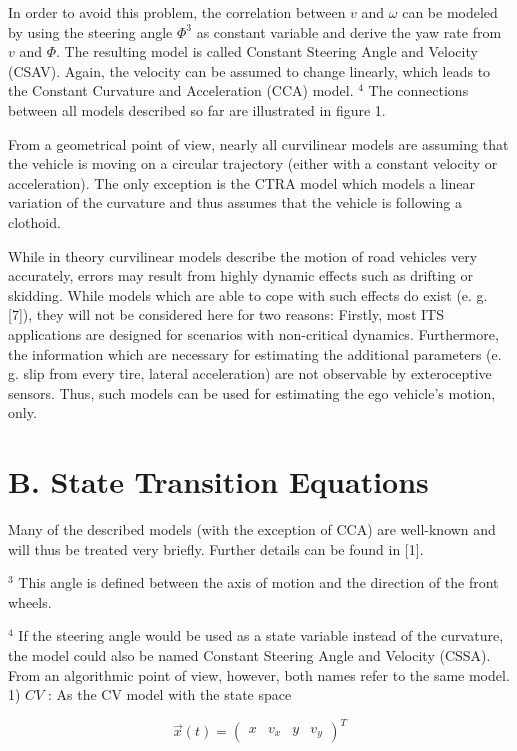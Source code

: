 In order to avoid this problem, the correlation between $v$ and $\omega$ can be modeled by using the steering angle $\Phi^{3}$ as constant variable and derive the yaw rate from $v$ and $\Phi$. The resulting model is called Constant Steering Angle and Velocity (CSAV). Again, the velocity can be assumed to change linearly, which leads to the Constant Curvature and Acceleration (CCA) model. ${ }^{4}$ The connections between all models described so far are illustrated in figure 1.

From a geometrical point of view, nearly all curvilinear models are assuming that the vehicle is moving on a circular trajectory (either with a constant velocity or acceleration). The only exception is the CTRA model which models a linear variation of the curvature and thus assumes that the vehicle is following a clothoid.

While in theory curvilinear models describe the motion of road vehicles very accurately, errors may result from highly dynamic effects such as drifting or skidding. While models which are able to cope with such effects do exist (e. g. [7]), they will not be considered here for two reasons: Firstly, most ITS applications are designed for scenarios with non-critical dynamics. Furthermore, the information which are necessary for estimating the additional parameters (e. g. slip from every tire, lateral acceleration) are not observable by exteroceptive sensors. Thus, such models can be used for estimating the ego vehicle's motion, only.

\section{B. State Transition Equations}
Many of the described models (with the exception of CCA) are well-known and will thus be treated very briefly. Further details can be found in [1].

${ }^{3}$ This angle is defined between the axis of motion and the direction of the front wheels.

${ }^{4}$ If the steering angle would be used as a state variable instead of the curvature, the model could also be named Constant Steering Angle and Velocity (CSSA). From an algorithmic point of view, however, both names refer to the same model. 1) $C V$ : As the CV model with the state space

$$
\vec{x}(t)=\left(\begin{array}{cccc}
	x & v_{x} & y & v_{y}
\end{array}\right)^{T}
$$

